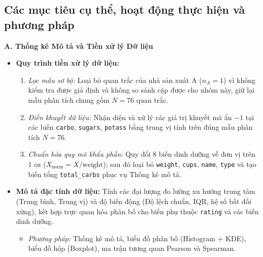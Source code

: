 \documentclass[12pt,a4paper]{article}
\begin{document}
\subsection{Các mục tiêu cụ thể, hoạt động thực hiện và phương pháp}

\textbf{A. Thống kê Mô tả và Tiền xử lý Dữ liệu}
\begin{itemize}
  \item \textbf{Quy trình tiền xử lý dữ liệu:}
  \begin{enumerate}
    \item \textit{Lọc mẫu sơ bộ:} Loại bỏ quan trắc của nhà sản xuất A ($n_A = 1$) vì không
    kiểm tra được giả định và không so sánh cặp được cho nhóm này, giữ lại mẫu phân tích chung
    gồm $N = 76$ quan trắc.
    \item \textit{Điền khuyết dữ liệu:} Nhận diện và xử lý các giá trị khuyết mã ẩn $-1$ tại
    các biến \texttt{carbo}, \texttt{sugars}, \texttt{potass} bằng trung vị tính trên đúng mẫu
    phân tích $N = 76$.
    \item \textit{Chuẩn hóa quy mô khẩu phần:} Quy đổi 8 biến dinh dưỡng về đơn vị trên 1 oz
    ($X_{\text{norm}} = X/\text{weight}$); sau đó loại bỏ \texttt{weight}, \texttt{cups},
    \texttt{name}, \texttt{type} và tạo biến tổng \texttt{total\_carbs} phục vụ Thống kê mô tả.
  \end{enumerate}
  \item \textbf{Mô tả đặc tính dữ liệu:} Tính các đại lượng đo lường xu hướng trung tâm
  (Trung bình, Trung vị) và độ biến động (Độ lệch chuẩn, IQR, hệ số bất đối xứng), kết hợp
  trực quan hóa phân bố cho biến phụ thuộc \texttt{rating} và các biến dinh dưỡng.
  \begin{itemize}
    \item \textit{Phương pháp:} Thống kê mô tả, biểu đồ phân bố (Histogram + KDE), biểu đồ hộp
    (Boxplot), ma trận tương quan Pearson và Spearman.
  \end{itemize}
\end{itemize}
\end{document}
